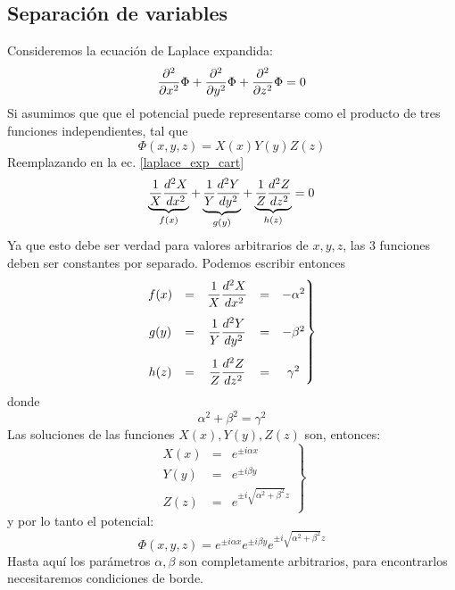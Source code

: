 \documentclass[]{article}
\numberwithin{equation}{section}
\begin{document}
\subsection{Separación de variables}
Consideremos la ecuación de Laplace expandida:
\begin{equation}
	\dfrac{\partial ^2}{\partial x^2}\Phi + \dfrac{\partial ^2}{\partial y^2}\Phi + \dfrac{\partial ^2}{\partial z^2}\Phi = 0\label{laplace_exp_cart}
\end{equation}
Si asumimos que que el potencial puede representarse como el producto de tres funciones independientes, tal que
\begin{equation}
	\Phi(x,y,z) = X(x) Y(y) Z(z)\label{pot_sep_cart}
\end{equation}
Reemplazando en la ec. \ref{laplace_exp_cart}
\begin{equation}
	\underbrace{\frac{1}{X}\dfrac{d ^2 X}{d x^2}}_{f(x)} + \underbrace{\frac{1}{Y}\dfrac{d ^2 Y}{d y^2}}_{g(y)} + \underbrace{\frac{1}{Z}\dfrac{d ^2 Z}{d z^2}}_{h(z)} = 0
\end{equation}
Ya que esto debe ser verdad para valores arbitrarios de \(x, y, z\), las 3 funciones deben ser constantes por separado. Podemos escribir entonces
\begin{equation}
	\left. \begin{matrix}
		f(x) &=& \dfrac{1}{X}\td{^2 X}{x^2} &=& -\alpha^2\vspace{3mm}\\
		g(y) &=& \dfrac{1}{Y}\td{^2 Y}{y^2} &=& -\beta^2\vspace{3mm}\\
		h(z) &=& \dfrac{1}{Z}\td{^2 Z}{z^2} &=& \gamma^2
	\end{matrix}\right\rbrace 
\end{equation}
donde
\begin{equation}
	\alpha^2 + \beta^2 = \gamma^2
\end{equation}
Las soluciones de las funciones \(X(x), Y(y), Z(z)\) son, entonces:
\begin{equation}
	\left. \begin{matrix}
		X(x) &=& e^{\pm i \alpha x}\\
		Y(y) &=& e^{\pm i \beta y}\\
		Z(z) &=& e^{\pm i \sqrt{\alpha^2 + \beta^2} z}
	\end{matrix}\right\rbrace 
\end{equation}
y por lo tanto el potencial:
\begin{equation}
	\Phi(x,y,z) = e^{\pm i \alpha x} e^{\pm i \beta y} e^{\pm i \sqrt{\alpha^2 + \beta^2} z}
\end{equation}
Hasta aquí los parámetros \(\alpha,\beta\) son completamente arbitrarios, para encontrarlos necesitaremos condiciones de borde.
\end{document}
